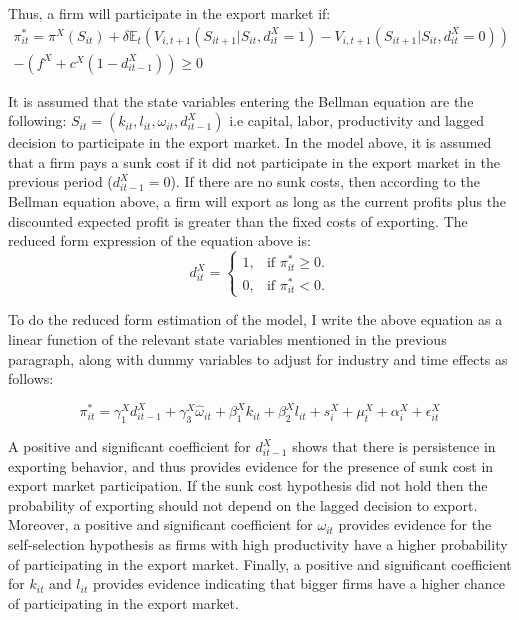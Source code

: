 \documentclass[12pt]{article}
\begin{document}
 Thus, a firm will participate in the export market if:
\begin{equation}
\begin{aligned}
\pi_{it}^{*} = \pi^{X}(S_{it})  +
\delta \mathbb{E}_{t}(V_{i,t+1}(S_{it+1}|S_{it},d_{it}^{X}=1) -
V_{i,t+1}(S_{it+1}|S_{it},d_{it}^{X}=0))\\ 
-  (f^{X} +
c^{X}(1-d_{it-1}^{X})) \geq 0
\end{aligned}
\end{equation}

It is assumed that the state variables entering the Bellman equation
are the following: $S_{it}= (k_{it}, l_{it}, \omega_{it},
d_{it-1}^{X})$ i.e capital, labor, productivity and lagged decision to
participate in the export market. In the model above, it is assumed
that a firm pays a sunk cost if it did not participate in the export
market in the previous period  ($d_{it-1}^{X} = 0$).  If there are no sunk costs, then
according to the Bellman equation above, a firm will export as long as
the current profits plus the discounted expected profit is greater
than the fixed costs of exporting. 
The reduced form expression of the equation above is: 
\begin{equation}
  d_{it}^{X}=\begin{cases}
   1 , & \text{if $\pi_{it}^{*} \geq 0$}.\\
   0 , & \text{if $\pi_{it}^{*}<  0$}.
  \end{cases}
\end{equation}

To do the reduced form estimation of the model, I write the above equation as a linear
function of the relevant state variables mentioned in the previous
paragraph, along with dummy variables to
adjust for industry and time effects as follows:

\begin{equation}
\label{eq:export}
  \pi_{it}^{*}=   \gamma_{1}^{X} d_{it-1}^{X} + 
\gamma_{3}^{X} \hat{\omega}_{it}  + \beta_{1}^{X}k_{it}  +\beta_{2}^{X}l_{it}+
s_{i}^{X} + \mu_{t}^{X}  + \alpha_{i}^{X}+ \epsilon_{it}^{X}
\end{equation}


A positive and significant coefficient for $d_{it-1}^{X}$ shows that there is
persistence in exporting behavior, and thus provides
evidence for the presence of sunk cost in export market participation.
If the sunk cost hypothesis did not hold then the probability of exporting
should not depend on the lagged decision to export. Moreover, a positive and significant
coefficient for $\omega_{it}$  provides evidence for the
self-selection hypothesis as firms with high
productivity have a higher probability of participating in the export
market. Finally, a positive and significant coefficient for $k_{it}$
and $l_{it}$ provides evidence indicating that bigger firms have a
higher chance of participating in the export market. 
\end{document}
